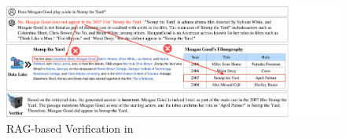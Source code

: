 \begin{figure}[h!]
\begin{center}
\includegraphics[width=\textwidth]{submissions/Nan2024/figs/verify.pdf}
\caption{RAG-based Verification in \sys}
\label{fig:verify}
\end{center}
\end{figure}
